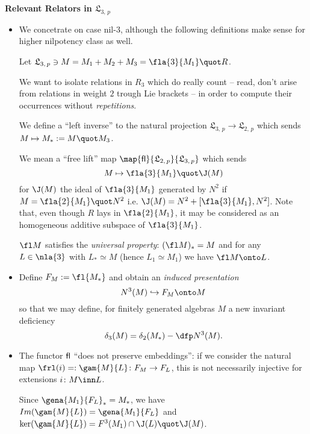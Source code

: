 \documentclass[a4paper,11pt,german,english]{report}
\newcommand{\nl}[1]{\mathfrak{L}_{#1,\,p}}
\begin{document}
\indent
{\bf Relevant Relators in $\mathfrak{L}_{3,\,p}$}
\begin{itemize}
\item[]We concetrate on case nil-$3$, although the following definitions make sense
for higher nilpotency class as well.

Let $\mathfrak{L}_{3,\,p}\ni M=M_{1}+M_{2}+M_{3}=\fla{3}{M_{1}}\quot R$.

We want to isolate relations in $R_{3}$ which do really count -- read, don't arise from
relations in weight $2$ trough Lie brackets -- in order to compute their occurrences without
{\em repetitions}.

We define a ``left inverse'' to the natural
projection $\nl{3}\to\nl{2}$ which sends $M\mapsto M_{*}:=M\quot M_{3}$.

We mean a ``free lift'' map $\map{{\sf fl}}{\mathfrak{L}_{2,\,p}}{\mathfrak{L}_{3,\,p}}$ which sends
$$M\mapsto\fla{3}{M_{1}}\quot\J(M)$$ for $\J(M)$
the ideal of $\fla{3}{M_{1}}$ generated by
$N^{2}$ if $M=\fla{2}{M_{1}}\quot N^{2}$ i.{}e. $\J(M)=N^{2}+[\fla{3}{M_{1}},N^{2}]$.
Note that, even though $R$ lays in $\fla{2}{M_{1}}$, it may be
considered as an homogeneous additive subspace of $\fla{3}{M_{1}}$.

$\fl M$ satisfies the {\em universal property}: $(\fl M)_{*}=M$ and for any
$L\in\nla{3}$ with $L_{*}\simeq M$ (hence $L_{1}\simeq M_{1}$) we have
$\fl M\onto L$.

\item[]Define $F_{M}:=\fl {M_{*}}$ and obtain an
{\em induced presentation}
$$N^{3}(M)\hookrightarrow F_{M}\onto M$$
so that we may define,
for finitely generated algebras $M$ a new invariant deficiency
$$\delta_{3}(M)=\delta_{2}(M_{*})-\dfp N^{3}(M).$$


\item[]The functor ${\sf fl}$ ``does not preserve embeddings'': if we consider the natural map
$\frl(i)=:\gam{M}{L}\colon F_{M}\to F_{L}$, this is not necessarily injective
for extensions $i\colon M\inn L$.%

Since ${\gena{M_{1}}{F_{L}}}_{*}=M_{*}$, we have $Im(\gam{M}{L})=\gena{M_{1}}{F_{L}}$ and $\ker(\gam{M}{L})=F^{3}(M_{1})\cap
\J(L)\quot\J(M)$.


\end{itemize}
\end{document}
